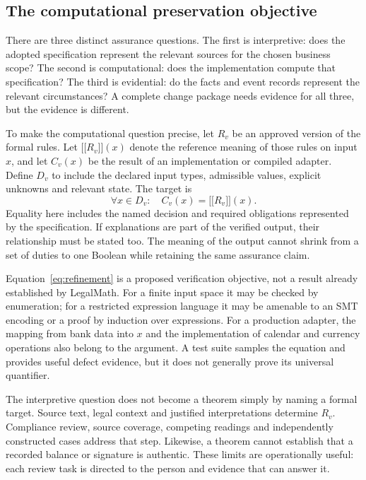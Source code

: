 \documentclass[12pt,a4paper,oneside,openany]{book}
\providecommand{\llbracket}{\mathopen{[\![}}
\providecommand{\rrbracket}{\mathclose{]\!]}}
\begin{document}
\subsection{The computational preservation objective}
\label{merge:P-03-product:05}

\label{sec:proof}

There are three distinct assurance questions. The first is interpretive: does the
adopted specification represent the relevant sources for the chosen business
scope? The second is computational: does the implementation compute that
specification? The third is evidential: do the facts and event records represent
the relevant circumstances? A complete change package needs evidence for all
three, but the evidence is different.

To make the computational question precise, let $R_v$ be an approved version of
the formal rules. Let $\llbracket R_v\rrbracket(x)$ denote the reference meaning
of those rules on input $x$, and let $C_v(x)$ be the result of an implementation
or compiled adapter. Define $D_v$ to include the declared input types, admissible
values, explicit unknowns and relevant state. The target is
\begin{equation}
 \forall x\in D_v:\quad C_v(x)=\llbracket R_v\rrbracket(x).
 \label{eq:refinement}
\end{equation}
Equality here includes the named decision and required obligations represented by
the specification. If explanations are part of the verified output, their
relationship must be stated too. The meaning of the output cannot shrink from a
set of duties to one Boolean while retaining the same assurance claim.

Equation~\eqref{eq:refinement} is a proposed verification objective, not a result
already established by LegalMath. For a finite input space it may be checked by
enumeration; for a restricted expression language it may be amenable to an SMT
encoding or a proof by induction over expressions. For a production adapter,
the mapping from bank data into $x$ and the implementation of calendar and
currency operations also belong to the argument. A test suite samples the
equation and provides useful defect evidence, but it does not generally prove its
universal quantifier.

The interpretive question does not become a theorem simply by naming a formal
target. Source text, legal context and justified interpretations determine
$R_v$. Compliance review, source coverage, competing readings and independently
constructed cases address that step. Likewise, a theorem cannot establish that
a recorded balance or signature is authentic. These limits are operationally
useful: each review task is directed to the person and evidence that can answer it.
\end{document}
